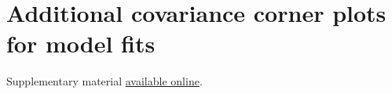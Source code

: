 \documentclass[fleqn,usenatbib, useAMS, a4paper]{mnras}
\begin{document}
\section{Additional covariance corner plots for model fits}
\label{sec:addit-covar-corn}
Supplementary material
\href{https://github.com/will-henney/javier-strucfunc-paper/blob/main/supplementary_material_strucfunc_paper.pdf}
{available online}.
%
\bsp	%
\label{lastpage}
\end{document}
